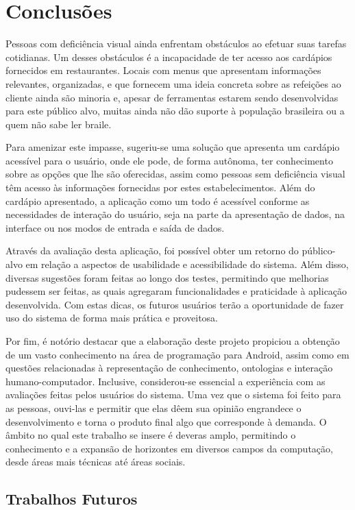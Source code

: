 \chapter{\label{chap:conclu}Conclusões}

Pessoas com deficiência visual ainda enfrentam obstáculos ao efetuar suas tarefas cotidianas. Um desses obstáculos é a incapacidade de ter acesso aos cardápios fornecidos em restaurantes. Locais com menus que apresentam informações relevantes, organizadas, e que fornecem uma ideia concreta sobre as refeições ao cliente ainda são minoria e, apesar de ferramentas estarem sendo desenvolvidas para este público alvo, muitas ainda não dão suporte à população brasileira ou a quem não sabe ler braile.

Para amenizar este impasse, sugeriu-se uma solução que apresenta um cardápio acessível para o usuário, onde ele pode, de forma autônoma, ter conhecimento sobre as opções que lhe são oferecidas, assim como pessoas sem deficiência visual têm acesso às informações fornecidas por estes estabelecimentos. Além do cardápio apresentado, a aplicação como um todo é acessível conforme as necessidades de interação do usuário, seja na parte da apresentação de dados, na interface ou nos modos de entrada e saída de dados.

Através da avaliação desta aplicação, foi possível obter um retorno do público-alvo em relação a aspectos de usabilidade e acessibilidade do sistema. Além disso, diversas sugestões foram feitas ao longo dos testes, permitindo que melhorias pudessem ser feitas, as quais agregaram funcionalidades e praticidade à aplicação desenvolvida. Com estas dicas, os futuros usuários terão a oportunidade de fazer uso do sistema de forma mais prática e proveitosa.

Por fim, é notório destacar que a elaboração deste projeto propiciou a obtenção de um vasto conhecimento na área de programação para Android, assim como em questões relacionadas à representação de conhecimento, ontologias e interação humano-computador. Inclusive, considerou-se essencial a experiência com as avaliações feitas pelos usuários do sistema. Uma vez que o sistema foi feito para as pessoas, ouvi-las e permitir que elas dêem sua opinião engrandece o desenvolvimento e torna o produto final algo que corresponde à demanda. O âmbito no qual este trabalho se insere é deveras amplo, permitindo o conhecimento e a expansão de horizontes em diversos campos da computação, desde áreas mais técnicas até áreas sociais. 

\section{Trabalhos Futuros}

